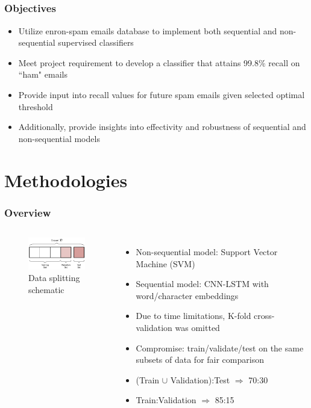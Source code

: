 \documentclass{beamer}
\begin{document}
	\subsection{}
	\begin{framefont}{\footnotesize}
		\begin{frame}
			\frametitle{Objectives}
			\begin{itemize}
				\setlength\itemsep{1.5em}
				\item Utilize enron-spam emails database to implement both sequential and non-sequential supervised classifiers
				\item Meet project requirement to develop a classifier that attains 99.8\% recall on ``ham" emails
				\item Provide input into recall values for future spam emails given selected optimal threshold
				\item Additionally, provide insights into effectivity and robustness of sequential and non-sequential models
			\end{itemize}
		\end{frame}
	\end{framefont}
	
	\section{Methodologies}
	\begin{framefont}{\footnotesize}
		\begin{frame}
			\frametitle{Overview}
			\vspace{-10pt}
			\begin{columns}
				\column{0.003\linewidth}
				\column{0.40\linewidth}
				\centering
				\begin{figure}
					\captionsetup{justification=centering}
					\includegraphics[width=4.3cm]{train-validate-test.png}
					\caption{Data splitting schematic \parencite{split}}
				\end{figure}
				\column{0.60\linewidth}
				\begin{itemize}
					\setlength\itemsep{1.5em}
					\item Non-sequential model: Support Vector Machine (SVM)
					\item Sequential model: CNN-LSTM with word/character embeddings
					\item Due to time limitations, K-fold cross-validation was omitted
					\item Compromise: train/validate/test on the same subsets of data for fair comparison
					\item (Train $\cup$ Validation):Test $\Longrightarrow$ 70:30
					\item Train:Validation $\Longrightarrow$ 85:15	
			\end{itemize}
			\end{columns}
		\end{frame}
	\end{framefont}
	
\end{document}
